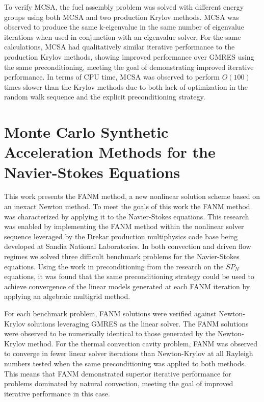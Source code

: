 To verify MCSA, the fuel assembly problem was solved with different
energy groups using both MCSA and two production Krylov methods. MCSA
was observed to produce the same k-eigenvalue in the same number of
eigenvalue iterations when used in conjunction with an eigenvalue
solver. For the same calculations, MCSA had qualitatively similar
iterative performance to the production Krylov methods, showing
improved performance over GMRES using the same preconditioning,
meeting the goal of demonstrating improved iterative performance. In
terms of CPU time, MCSA was observed to perform $O(100)$ times slower
than the Krylov methods due to both lack of optimization in the random
walk sequence and the explicit preconditioning strategy.

\section{Monte Carlo Synthetic Acceleration Methods for the Navier-Stokes Equations\ }
\label{sec:nonlinear_conclusions}
This work presents the FANM method, a new nonlinear solution scheme
based on an inexact Newton method. To meet the goals of this work the
FANM method was characterized by applying it to the Navier-Stokes
equations. This research was enabled by implementing the FANM method
within the nonlinear solver sequence leveraged by the Drekar
production multiphysics code base being developed at Sandia National
Laboratories. In both convection and driven flow regimes we solved
three difficult benchmark problems for the Navier-Stokes
equations. Using the work in preconditioning from the research on the
$SP_N$ equations, it was found that the same preconditioning strategy
could be used to achieve convergence of the linear models generated at
each FANM iteration by applying an algebraic multigrid method.

For each benchmark problem, FANM solutions were verified against
Newton-Krylov solutions leveraging GMRES as the linear solver. The
FANM solutions were observed to be numerically identical to those
generated by the Newton-Krylov method. For the thermal convection
cavity problem, FANM was observed to converge in fewer linear solver
iterations than Newton-Krylov at all Rayleigh numbers tested when the
same preconditioning was applied to both methods. This means that FANM
demonstrated superior iterative performance for problems dominated by
natural convection, meeting the goal of improved iterative performance
in this case.


